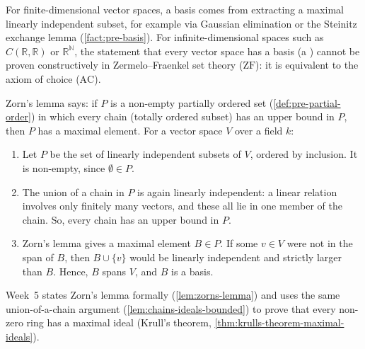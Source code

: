 \begin{content}

\end{content}

\begin{aiNote}
For finite-dimensional vector spaces, a basis comes from extracting a maximal linearly independent subset, for example via Gaussian elimination or the Steinitz exchange lemma (\cref{fact:pre-basis}). For infinite-dimensional spaces such as $C(\mathbb{R}, \mathbb{R})$ or $\mathbb{R}^\mathbb{N}$, the statement that every vector space has a basis (a ) cannot be proven constructively in Zermelo--Fraenkel set theory ($\text{ZF}$): it is equivalent to the axiom of choice ($\text{AC}$).

Zorn's lemma says: if $P$ is a non-empty partially ordered set (\cref{def:pre-partial-order}) in which every chain (totally ordered subset) has an upper bound in $P$, then $P$ has a maximal element. For a vector space $V$ over a field $k$:
\begin{enumerate}[label=\textbf{(\arabic*)}]
    \item Let $P$ be the set of linearly independent subsets of $V$, ordered by inclusion. It is non-empty, since $\emptyset \in P$.
    \item The union of a chain in $P$ is again linearly independent: a linear relation involves only finitely many vectors, and these all lie in one member of the chain. So, every chain has an upper bound in $P$.
    \item Zorn's lemma gives a maximal element $B \in P$. If some $v \in V$ were not in the span of $B$, then $B \cup \{v\}$ would be linearly independent and strictly larger than $B$. Hence, $B$ spans $V$, and $B$ is a basis.
\end{enumerate}
Week~5 states Zorn's lemma formally (\cref{lem:zorns-lemma}) and uses the same union-of-a-chain argument (\cref{lem:chains-ideals-bounded}) to prove that every non-zero ring has a maximal ideal (Krull's theorem, \cref{thm:krulls-theorem-maximal-ideals}).
\end{aiNote}

